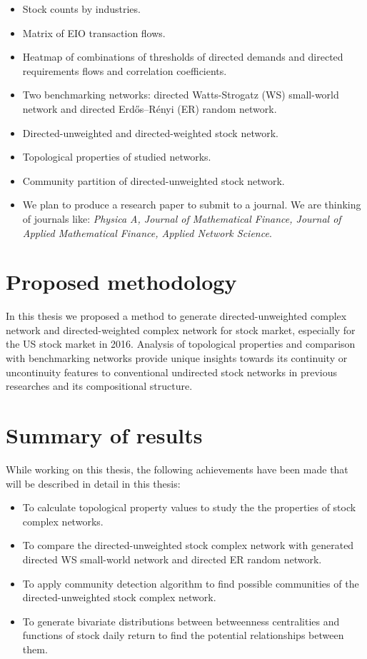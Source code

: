\begin{itemize}
	\item Stock counts by industries.
	\item Matrix of EIO transaction flows.
	\item Heatmap of combinations of thresholds of directed demands and directed requirements flows and correlation coefficients.
	\item Two benchmarking networks: directed Watts-Strogatz (WS) small-world network and directed Erdős–Rényi (ER) random network.
	\item Directed-unweighted and directed-weighted stock network.
	\item Topological properties of studied networks.
	\item Community partition of directed-unweighted stock network.
	\item We plan to produce a research paper to submit to a journal. We are thinking of journals like:  \textit{Physica A, Journal of Mathematical Finance, Journal of Applied Mathematical Finance, Applied Network Science}.
\end{itemize}

\section{Proposed methodology}


In this thesis we proposed a method to generate directed-unweighted complex network and directed-weighted complex network for stock market, especially for the US stock market in 2016. Analysis of topological properties and comparison with benchmarking networks provide unique insights towards its continuity or uncontinuity features to conventional undirected stock networks in previous researches and its compositional structure.

\section{Summary of results}
While working on this thesis, the following achievements have been made that will be described in detail in this thesis:

\begin{itemize}
	\item To calculate topological property values to study the the properties of stock complex networks.
	\item To compare the directed-unweighted stock complex network with generated directed WS small-world network and directed ER random network.
	\item To apply community detection algorithm to find possible communities of the directed-unweighted stock complex network.
	\item To generate bivariate distributions between betweenness centralities and functions of stock daily return to find the potential relationships between them.
\end{itemize}

